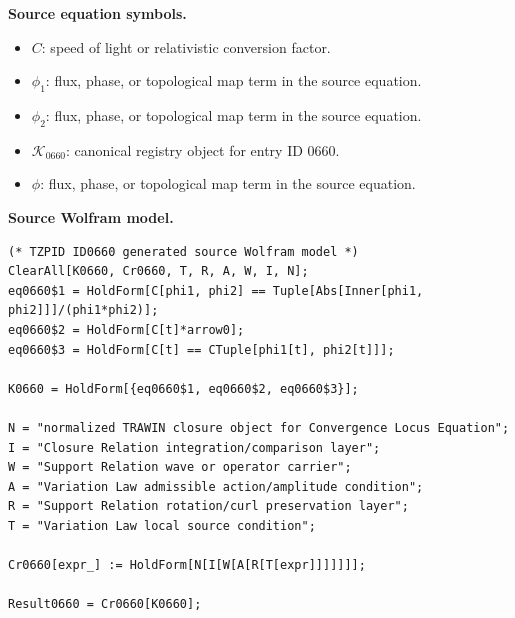 \begin{minipage}[t]{0.49\linewidth}
\begingroup
\small
\raggedright
\textbf{Source equation symbols.}\par
\begin{itemize}[leftmargin=1.35em,itemsep=1pt,topsep=1pt,parsep=0pt]
    \item $C$: speed of light or relativistic conversion factor.
    \item $\phi_1$: flux, phase, or topological map term in the source equation.
    \item $\phi_2$: flux, phase, or topological map term in the source equation.
    \item $\mathcal{K}_{0660}$: canonical registry object for entry ID 0660.
    \item $\phi$: flux, phase, or topological map term in the source equation.
\end{itemize}
\endgroup
\end{minipage}\hfill
\begin{minipage}[t]{0.47\linewidth}
\begingroup
\scriptsize
\raggedright
\textbf{Source Wolfram model.}\par
\begin{Verbatim}[fontsize=\tiny,breaklines=true,breakanywhere=true]
(* TZPID ID0660 generated source Wolfram model *)
ClearAll[K0660, Cr0660, T, R, A, W, I, N];
eq0660$1 = HoldForm[C[phi1, phi2] == Tuple[Abs[Inner[phi1, phi2]]]/(phi1*phi2)];
eq0660$2 = HoldForm[C[t]*arrow0];
eq0660$3 = HoldForm[C[t] == CTuple[phi1[t], phi2[t]]];

K0660 = HoldForm[{eq0660$1, eq0660$2, eq0660$3}];

N = "normalized TRAWIN closure object for Convergence Locus Equation";
I = "Closure Relation integration/comparison layer";
W = "Support Relation wave or operator carrier";
A = "Variation Law admissible action/amplitude condition";
R = "Support Relation rotation/curl preservation layer";
T = "Variation Law local source condition";

Cr0660[expr_] := HoldForm[N[I[W[A[R[T[expr]]]]]]];

Result0660 = Cr0660[K0660];
\end{Verbatim}
\endgroup
\end{minipage}

